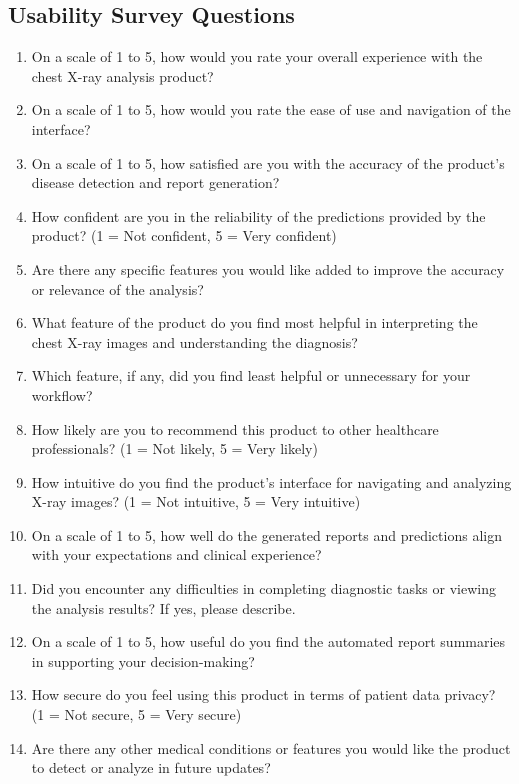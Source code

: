 \documentclass[12pt, titlepage]{article}
\begin{document}
\begin{enumerate}
\begin{enumerate}
\begin{enumerate}
\subsection{Usability Survey Questions}

\begin{enumerate}
  \item On a scale of 1 to 5, how would you rate your overall experience with the chest X-ray analysis product?
  \item On a scale of 1 to 5, how would you rate the ease of use and navigation of the interface?
  \item On a scale of 1 to 5, how satisfied are you with the accuracy of the product's disease detection and report generation?
  \item How confident are you in the reliability of the predictions provided by the product? (1 = Not confident, 5 = Very confident)
  \item Are there any specific features you would like added to improve the accuracy or relevance of the analysis?
  \item What feature of the product do you find most helpful in interpreting the chest X-ray images and understanding the diagnosis?
  \item Which feature, if any, did you find least helpful or unnecessary for your workflow?
  \item How likely are you to recommend this product to other healthcare professionals? (1 = Not likely, 5 = Very likely)
  \item How intuitive do you find the product’s interface for navigating and analyzing X-ray images? (1 = Not intuitive, 5 = Very intuitive)
  \item On a scale of 1 to 5, how well do the generated reports and predictions align with your expectations and clinical experience?
  \item Did you encounter any difficulties in completing diagnostic tasks or viewing the analysis results? If yes, please describe.
  \item On a scale of 1 to 5, how useful do you find the automated report summaries in supporting your decision-making?
  \item How secure do you feel using this product in terms of patient data privacy? (1 = Not secure, 5 = Very secure)
  \item Are there any other medical conditions or features you would like the product to detect or analyze in future updates?
\end{enumerate}



\end{enumerate}
\end{enumerate}
\end{enumerate}
\end{document}
